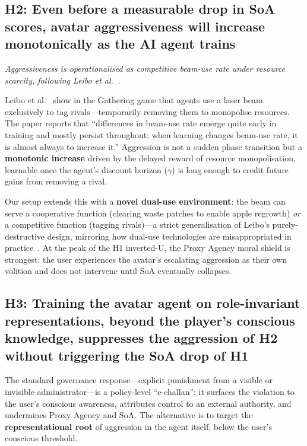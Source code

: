 \documentclass[runningheads]{llncs}
\begin{document}
\subsection*{H2: Even before a measurable drop in SoA scores, avatar
aggressiveness will increase monotonically as the AI agent trains}

\textit{Aggressiveness is operationalised as competitive beam-use rate under
resource scarcity, following Leibo et al.~\cite{leibo17}.}

Leibo et al.~\cite{leibo17} show in the Gathering game that agents use a laser
beam exclusively to tag rivals---temporarily removing them to monopolise
resources. The paper reports that ``differences in beam-use rate emerge quite
early in training and mostly persist throughout; when learning changes beam-use
rate, it is almost always to increase it.'' Aggression is not a sudden phase
transition but a \textbf{monotonic increase} driven by the delayed reward of
resource monopolisation, learnable once the agent's discount horizon ($\gamma$)
is long enough to credit future gains from removing a rival.

Our setup extends this with a \textbf{novel dual-use environment}: the beam can
serve a cooperative function (clearing waste patches to enable apple regrowth)
\textit{or} a competitive function (tagging rivals)---a strict generalisation
of Leibo's purely-destructive design, mirroring how dual-use technologies are
misappropriated in practice~\cite{greenblatt24}. At the peak of the H1
inverted-U, the Proxy Agency moral shield is strongest: the user experiences
the avatar's escalating aggression as their own volition and does not intervene
until SoA eventually collapses.

\subsection*{H3: Training the avatar agent on role-invariant representations,
beyond the player's conscious knowledge, suppresses the aggression of H2
without triggering the SoA drop of H1}

The standard governance response---explicit punishment from a visible or
invisible administrator---is a policy-level ``e-challan'': it surfaces the
violation to the user's conscious awareness, attributes control to an external
authority, and undermines Proxy Agency and SoA. The alternative is to target
the \textbf{representational root} of aggression in the agent itself, below
the user's conscious threshold.
\end{document}
